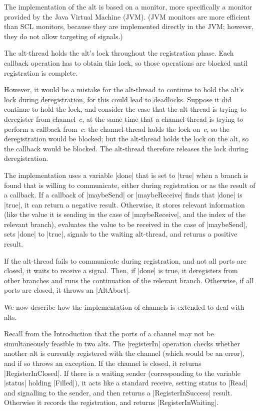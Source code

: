 The implementation of the alt is based on a monitor, more specifically a
monitor provided by the Java Virtual Machine (JVM).  (JVM monitors are more
efficient than SCL monitors, because they are implemented directly in the JVM;
however, they do not allow targeting of signals.)  

The alt-thread holds the alt's lock throughout the registration phase.  Each
callback operation has to obtain this lock, so those operations are blocked
until registration is complete. 

However, it would be a mistake for the alt-thread to continue to hold the
alt's lock during deregistration, for this could lead to deadlocks.  Suppose
it did continue to hold the lock, and consider the case that the alt-thread is
trying to deregister from channel~$c$, at the same time that a channel-thread
is trying to perform a callback from~$c$: the channel-thread holds the lock
on~$c$, so the deregistration would be blocked; but the alt-thread holds the
lock on the alt, so the callback would be blocked.  The alt-thread therefore
releases the lock during deregistration. 

The implementation uses a variable |done| that is set to |true| when a
branch is found that is willing to communicate, either during registration or
as the result of a callback.  If a callback of |maybeSend| or |maybeReceive|
finds that |done| is |true|, it can return a negative result.  Otherwise, it
stores relevant information (like the value it is sending in the case of
|maybeReceive|, and the index of the relevant branch), evaluates the value to
be received in the case of |maybeSend|, sets |done| to |true|, signals to the
waiting alt-thread, and returns a positive result.

If the alt-thread fails to communicate during registration, and not all
ports are closed, it waits to receive a signal.  Then, if |done| is true, it
deregisters from other branches and runs the continuation of the relevant
branch.  Otherwise, if all ports are closed, it throws an |AltAbort|. 


We now describe how the implementation of channels is extended to deal with
alts.

Recall from the Introduction that the ports of a channel may not be
simultaneously feasible in two alts.
The |registerIn| operation checks whether another alt is currently registered
with the channel (which would be an error), and if so throws an exception.  If
the channel is closed, it returns |RegisterInClosed|.  If there is a waiting
sender (corresponding to the variable |status| holding |Filled|), it acts like
a standard receive, setting status to |Read| and signalling to the sender, and
then returns a |RegisterInSuccess| result.  Otherwise it records the
registration, and returns |RegisterInWaiting|.

